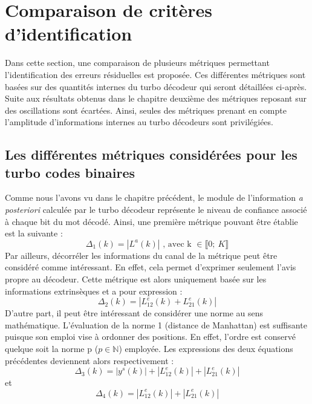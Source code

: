 \section{Comparaison de critères d'identification}
Dans cette section, une comparaison de plusieurs métriques permettant l'identification des erreurs résiduelles est 
proposée. Ces différentes métriques sont basées sur des quantités internes du turbo décodeur qui seront détaillées ci-après.\\
Suite aux résultats obtenus dans le chapitre deuxième des métriques reposant sur des oscillations sont écartées. Ainsi, 
seules des métriques prenant en compte l'amplitude d'informations internes au turbo décodeurs sont privilégiées.

\subsection{Les différentes métriques considérées pour les turbo codes binaires}
Comme nous l'avons vu dans le chapitre précédent, le module de l'information \textit{a posteriori} calculée par le turbo 
décodeur représente le niveau de confiance associé à chaque bit du mot décodé.
Ainsi, une première métrique pouvant 
être établie est la suivante :
\begin{equation}
	\Delta_1(k) = |L^a(k)|\text{~, avec k~}\in \llbracket0;~K \rrbracket 
\end{equation}
Par ailleurs, décorréler les informations du canal de la métrique peut être considéré comme intéressant.
En effet, 
cela permet d'exprimer seulement l'avis propre au décodeur. Cette métrique est alors uniquement basée sur les informations 
extrinsèques et a pour expression : 
\begin{equation}
	\Delta_2(k) = |L^e_{12}(k)+L^e_{21}(k)|
\end{equation}
D'autre part, il peut être intéressant de considérer une norme au sens mathématique. L'évaluation de la norme 1 
(distance de Manhattan) est suffisante puisque son emploi vise à ordonner des positions. En effet, l'ordre est 
conservé quelque soit la norme p ($p \in \mathbb{N} $) employée. Les expressions des deux équations précédentes deviennent 
alors respectivement :
\begin{equation}
	\Delta_3(k) = |y^s(k)| + |L^e_{12}(k)| + |L^e_{21}(k)|
\end{equation}
et 
\begin{equation}
	\Delta_4(k) = |L^e_{12}(k)| + |L^e_{21}(k)|
\end{equation}


